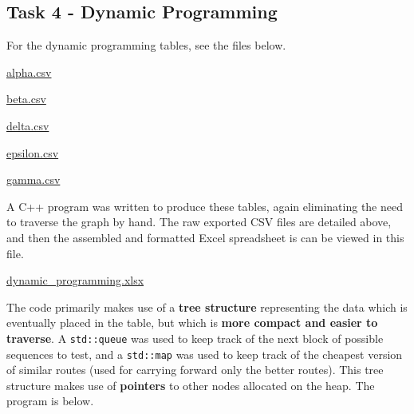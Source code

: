 \documentclass[
]{article}
\begin{document}
\newpage

\subsection{Task 4 - Dynamic
Programming}\label{task-4---dynamic-programming}

For the dynamic programming tables, see the files below.

\url{alpha.csv}

\url{beta.csv}

\url{delta.csv}

\url{epsilon.csv}

\url{gamma.csv}

A C++ program was written to produce these tables, again eliminating the
need to traverse the graph by hand. The raw exported CSV files are
detailed above, and then the assembled and formatted Excel spreadsheet
is can be viewed in this file.

\url{dynamic_programming.xlsx}

The code primarily makes use of a \textbf{tree structure} representing
the data which is eventually placed in the table, but which is
\textbf{more compact and easier to traverse}. A \texttt{std::queue} was
used to keep track of the next block of possible sequences to test, and
a \texttt{std::map} was used to keep track of the cheapest version of
similar routes (used for carrying forward only the better routes). This
tree structure makes use of \textbf{pointers} to other nodes allocated
on the heap. The program is below.
\end{document}

